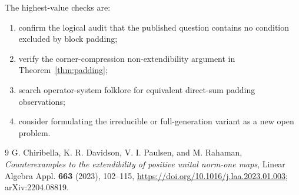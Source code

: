 \documentclass[11pt]{article}
\theoremstyle{remark}
\begin{document}
The highest-value checks are:

\begin{enumerate}
  \item confirm the logical audit that the published question contains no condition excluded by block padding;
  \item verify the corner-compression non-extendibility argument in Theorem~\ref{thm:padding};
  \item search operator-system folklore for equivalent direct-sum padding observations;
  \item consider formulating the irreducible or full-generation variant as a new open problem.
\end{enumerate}

\begin{thebibliography}{9}
G. Chiribella, K. R. Davidson, V. I. Paulsen, and M. Rahaman,
\emph{Counterexamples to the extendibility of positive unital norm-one maps},
Linear Algebra Appl. \textbf{663} (2023), 102--115,
\url{https://doi.org/10.1016/j.laa.2023.01.003}; arXiv:2204.08819.
\end{thebibliography}
\end{document}
